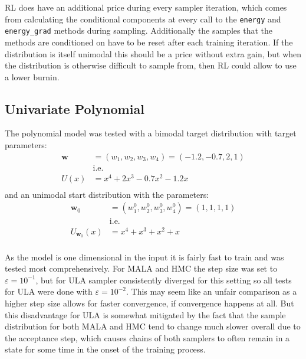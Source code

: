 RL does have an additional price during every sampler iteration, 
which comes from calculating the conditional components at every call to the \texttt{energy} and \texttt{energy\_grad} methods during sampling.
Additionally the samples that the methods are conditioned on have to be reset after each training iteration.
If the distribution is itself unimodal this should be a price without extra gain, but when the distribution is otherwise difficult to sample from,
then RL could allow to use a lower burnin.


\subsection{Univariate Polynomial}

The polynomial model was tested with a bimodal target distribution with target parameters:
\[
\begin{aligned}
	\bm{w} &= (w_1, w_2, w_3, w_4) = ( -1.2, -0.7, 2, 1 ) \\
	&\text{i.e.} \\
	U(x) &= x^4 + 2 x^3 - 0.7 x^2 - 1.2 x \\
\end{aligned}
\]
and an unimodal start distribution with the parameters:
\[
\begin{aligned}
	\bm{w}_0 &= (w_1^0, w_2^0, w_3^0, w_4^0) = ( 1, 1, 1, 1 ) \\
	&\text{i.e.} \\
	U_{\bm{w}_0} (x) &= x^4 + x^3 + x^2 + x \\
\end{aligned}
\]

As the model is one dimensional in the input it is fairly fast to train and was tested most comprehensively.
For MALA and HMC the step size was set to $\varepsilon = 10^{-1}$, 
but for ULA sampler consistently diverged for this setting so all tests for ULA were done with $\varepsilon = 10^{-2}$.
This may seem like an unfair comparison as a higher step size allows for faster convergence, if convergence happens at all.
But this disadvantage for ULA is somewhat mitigated by the fact that the sample distribution for both MALA and HMC tend to change much slower overall
due to the acceptance step, which causes chains of both samplers to often remain in a state for some time in the onset of the training process.

